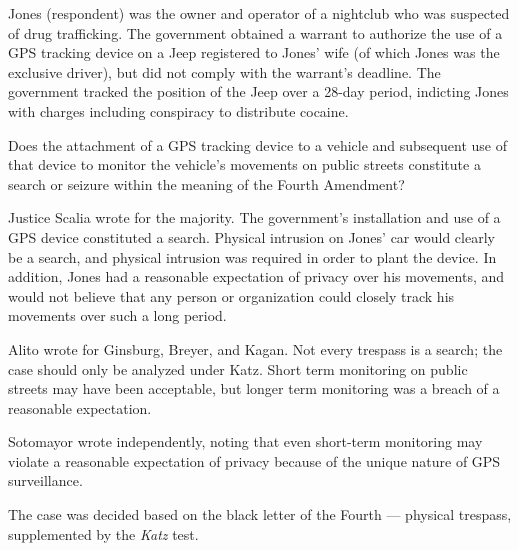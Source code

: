 \documentclass[paper=letter,fontsize=10pt]{article}
\newcommand{\case}[3]{\noindent {\large\textbf{\textit{#1}, #2 (#3)}} \par}
\begin{document}
	\begin{description}[align=right]
		\item[Facts] \noindent
			Jones (respondent) was the owner and operator of a nightclub who was suspected of drug trafficking. 
			The government obtained a warrant to authorize the use of a GPS tracking device on a Jeep registered to Jones’ wife (of which Jones was the exclusive driver), but did not comply with the warrant’s deadline. 
			The government tracked the position of the Jeep over a 28-day period, indicting Jones with charges including conspiracy to distribute cocaine.
		\item[Issue] \noindent
			Does the attachment of a GPS tracking device to a vehicle and subsequent use of that device to monitor the vehicle’s movements on public streets constitute a search or seizure within the meaning of the Fourth Amendment?
		\item[Holding] \noindent
			Justice Scalia wrote for the majority. The government’s installation and use of a GPS device constituted a search.
			Physical intrusion on Jones’ car would clearly be a search, and physical intrusion was required in order to plant the device. In addition, Jones had a reasonable expectation of privacy over his movements, and would not believe that any person or organization could closely track his movements over such a long period.
		\item[Concurrence] \noindent
			Alito wrote for Ginsburg, Breyer, and Kagan. Not every trespass is a search; the case should only be analyzed under Katz. Short term monitoring on public streets may have been acceptable, but longer term monitoring was a breach of a reasonable expectation. \par
			Sotomayor wrote independently, noting that even short-term monitoring may violate a reasonable expectation of privacy because of the unique nature of GPS surveillance.
		\item[Rules] \noindent
			The case was decided based on the black letter of the Fourth --- physical trespass, supplemented by the \textit{Katz} test.
	\end{description}
\case{Kentucky v. King}{563 U.S. 452}{2011}
\end{document}
